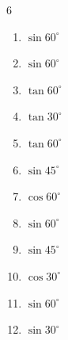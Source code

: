 \begin{multicols}{6}
\begin{enumerate}
  \item $\displaystyle \sin{60^\circ}$


  \item $\displaystyle \sin{60^\circ}$


  \item $\displaystyle \tan{60^\circ}$


  \item $\displaystyle \tan{30^\circ}$


  \item $\displaystyle \tan{60^\circ}$


  \item $\displaystyle \sin{45^\circ}$


  \item $\displaystyle \cos{60^\circ}$


\columnbreak %

  \item $\displaystyle \sin{60^\circ}$


  \item $\displaystyle \sin{45^\circ}$


  \item $\displaystyle \cos{30^\circ}$


  \item $\displaystyle \sin{60^\circ}$


  \item $\displaystyle \sin{30^\circ}$



\end{enumerate}
\end{multicols}
